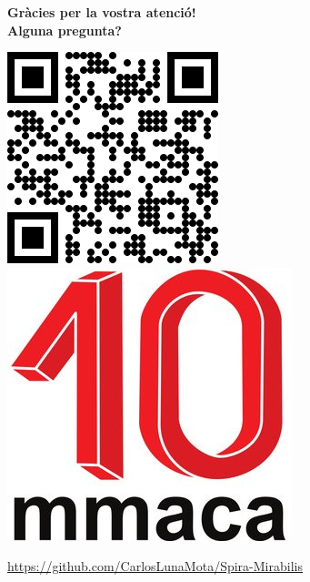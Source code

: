 \documentclass[14pt]{beamer}
\begin{document}
    \begin{frame}{}
        \begin{center}
            \textbf{\Large Gràcies per la vostra atenció!\\[1ex]Alguna pregunta?}

            \bigskip \bigskip

            \href{https://github.com/CarlosLunaMota/Spira-Mirabilis}{\includegraphics[height=16ex]{pictures/QR.png}} \qquad \quad \href{https://mmaca.cat/}{\includegraphics[height=16ex]{pictures/MMACA_10.jpeg}}

            \bigskip \bigskip
            
            \href{https://github.com/CarlosLunaMota/Spira-Mirabilis}{https://github.com/CarlosLunaMota/Spira-Mirabilis}
        \end{center}
    \end{frame}
    
\end{document}
